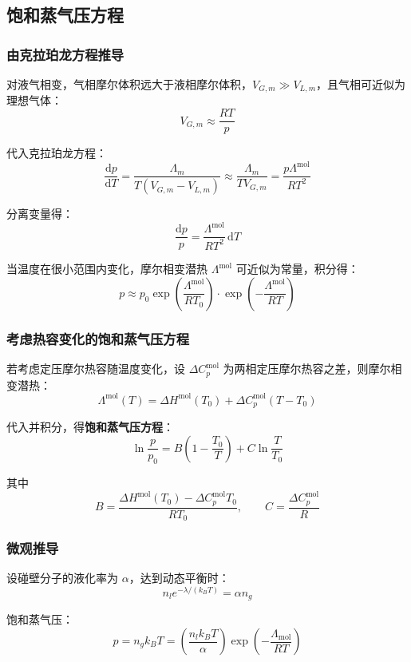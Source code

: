\documentclass[UTF8]{ctexart}
\begin{document}
\subsection{饱和蒸气压方程}

\subsubsection{由克拉珀龙方程推导}

对液气相变，气相摩尔体积远大于液相摩尔体积，$V_{G,m}\gg V_{L,m}$，且气相可近似为理想气体：
\[
V_{G,m}\approx\frac{RT}{p}
\]

代入克拉珀龙方程：
\[
\frac{\mathrm{d}p}{\mathrm{d}T}
=\frac{\Lambda_m}{T(V_{G,m}-V_{L,m})}
\approx\frac{\Lambda_m}{TV_{G,m}}
=\frac{p\Lambda^{\mathrm{mol}}}{RT^2}
\]

分离变量得：
\[
\frac{\mathrm{d}p}{p}=\frac{\Lambda^{\mathrm{mol}}}{RT^2}\,\mathrm{d}T
\]

当温度在很小范围内变化，摩尔相变潜热 $\Lambda^{\mathrm{mol}}$ 可近似为常量，积分得：
\[
\boxed{p\approx p_0\exp\!\left(\frac{\Lambda^{\mathrm{mol}}}{RT_0}\right)
\cdot\exp\!\left(-\frac{\Lambda^{\mathrm{mol}}}{RT}\right)}
\]

\subsubsection{考虑热容变化的饱和蒸气压方程}

若考虑定压摩尔热容随温度变化，设 $\Delta C_p^{\mathrm{mol}}$ 为两相定压摩尔热容之差，则摩尔相变潜热：
\[
\Lambda^{\mathrm{mol}}(T)=\Delta H^{\mathrm{mol}}(T_0)+\Delta C_p^{\mathrm{mol}}(T-T_0)
\]

代入并积分，得\textbf{饱和蒸气压方程}：
\[
\boxed{\ln\frac{p}{p_0}=B\!\left(1-\frac{T_0}{T}\right)+C\ln\frac{T}{T_0}}
\]

其中
\[
B=\frac{\Delta H^{\mathrm{mol}}(T_0)-\Delta C_p^{\mathrm{mol}}T_0}{RT_0},
\qquad
C=\frac{\Delta C_p^{\mathrm{mol}}}{R}
\]

\subsubsection{微观推导}

设碰壁分子的液化率为 $\alpha$，达到动态平衡时：
\[
n_l e^{-\lambda/(k_B T)}=\alpha n_g
\]

饱和蒸气压：
\[
p=n_g k_B T=\left(\frac{n_l k_B T}{\alpha}\right)
\exp\!\left(-\frac{\Lambda_{\mathrm{mol}}}{RT}\right)
\]
\end{document}

